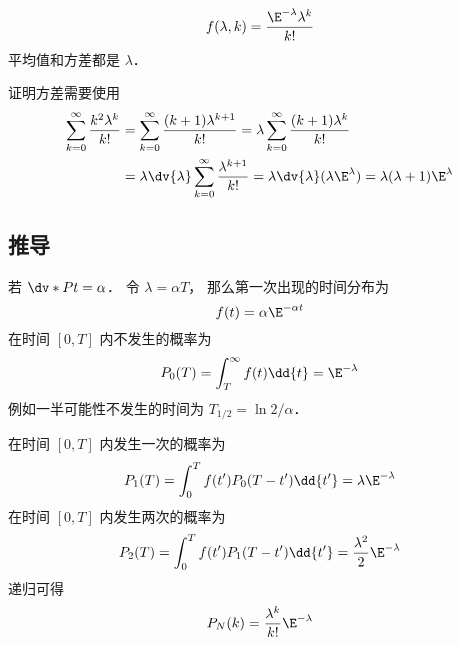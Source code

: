 
\begin{issues}
\issueDraft
\end{issues}

\begin{equation}
f(\lambda, k) = \frac{\E^{-\lambda}\lambda^k}{k!}
\end{equation}
平均值和方差都是 $\lambda$．

证明方差需要使用
\begin{equation}
\begin{aligned}
\sum_{k=0}^\infty \frac{k^2\lambda^{k}}{k!}
&= \sum_{k=0}^\infty \frac{(k+1)\lambda^{k+1}}{k!}
= \lambda \sum_{k=0}^\infty \frac{(k+1)\lambda^k}{k!}\\
&= \lambda\dv{\lambda} \sum_{k=0}^\infty \frac{\lambda^{k+1}}{k!}
= \lambda \dv{\lambda} (\lambda \E^{\lambda})
= \lambda(\lambda+1)\E^{\lambda}
\end{aligned}
\end{equation}

\subsection{推导}
若 $\dv*{P}{t} = \alpha$． 令 $\lambda = \alpha T$， 那么第一次出现的时间分布为
\begin{equation}
f(t) = \alpha\E^{-\alpha t}
\end{equation}
在时间 $[0,T]$ 内不发生的概率为
\begin{equation}
P_0(T) = \int_{T}^\infty f(t) \dd{t} = \E^{-\lambda}
\end{equation}
例如一半可能性不发生的时间为 $T_{1/2} = \ln 2/\alpha$．

在时间 $[0,T]$ 内发生一次的概率为
\begin{equation}
P_1(T) = \int_{0}^{T} f(t') P_0(T-t')\dd{t'} = \lambda \E^{-\lambda}
\end{equation}
在时间 $[0,T]$ 内发生两次的概率为
\begin{equation}
P_2(T) = \int_{0}^{T} f(t') P_1(T-t')\dd{t'} = \frac{\lambda^2}{2}\E^{-\lambda}
\end{equation}
递归可得
\begin{equation}
P_N(k) = \frac{\lambda^k}{k!}\E^{-\lambda}
\end{equation}
